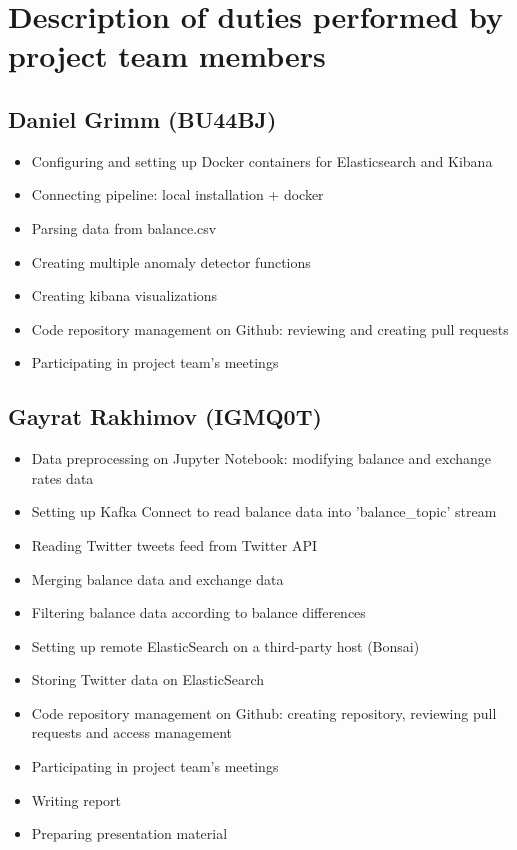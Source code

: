 \documentclass{article}
\begin{document}
\section{Description of duties performed by project team members}

\subsection{Daniel Grimm (BU44BJ)}

\begin{itemize}
    \item Configuring and setting up Docker containers for Elasticsearch and Kibana
    \item Connecting pipeline: local installation + docker
    \item Parsing data from balance.csv
    \item Creating multiple anomaly detector functions
    \item Creating kibana visualizations
    \item Code  repository  management  on  Github: reviewing and creating pull requests
    \item Participating in project team’s meetings
\end{itemize}

\subsection{Gayrat Rakhimov (IGMQ0T)}

\begin{itemize}
    \item Data preprocessing on Jupyter Notebook: modifying balance and exchange rates data
    \item Setting up Kafka Connect to read balance data into 'balance\_topic' stream
    \item Reading Twitter tweets feed from Twitter API
    \item Merging balance data and exchange data
    \item Filtering balance data according to balance differences
    \item Setting up remote ElasticSearch on a third-party host (Bonsai)
    \item Storing Twitter data on ElasticSearch
    \item Code repository management on Github: creating repository, reviewing pull requests and access management
    \item Participating in project team's meetings
    \item Writing report
    \item Preparing presentation material
\end{itemize}
\end{document}
